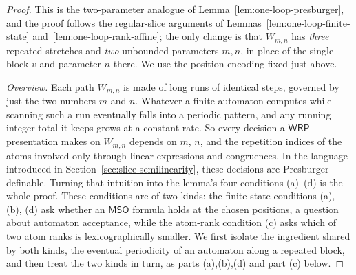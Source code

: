 \documentclass[11pt]{article}
\theoremstyle{definition}
\newcommand{\WRP}{\mathsf{WRP}}
\newcommand{\MSO}{\mathsf{MSO}}
\begin{document}
\begin{proof}
This is the two-parameter analogue of
Lemma~\ref{lem:one-loop-presburger}, and the proof follows the regular-slice
arguments of Lemmas~\ref{lem:one-loop-finite-state}
and~\ref{lem:one-loop-rank-affine}; the only change is that $W_{m,n}$ has
\emph{three} repeated stretches and \emph{two} unbounded parameters $m,n$, in
place of the single block $v$ and parameter $n$ there.  We use the position
encoding fixed just above.

\vspace{0.5em}
\noindent\emph{Overview.}  Each path $W_{m,n}$ is made of long runs of
identical steps, governed by just the two numbers $m$ and $n$.  Whatever a finite
automaton computes while scanning such a run eventually falls into a periodic
pattern, and any running integer total it keeps grows at a constant rate.  So
every decision a $\WRP$ presentation makes on $W_{m,n}$ depends on $m$, $n$, and
the repetition indices of the atoms involved only through linear expressions and
congruences.  In the language introduced in
Section~\ref{sec:slice-semilinearity}, these decisions are
Presburger-definable.  Turning
that intuition into the lemma's four conditions (a)--(d) is the whole proof.
These conditions are of two kinds: the finite-state conditions (a), (b), (d) ask
whether an $\MSO$ formula holds at the chosen positions, a question about
automaton acceptance, while the atom-rank condition (c) asks which of two atom
ranks is lexicographically smaller.  We first isolate the ingredient shared by
both kinds, the eventual
periodicity of an automaton along a repeated block, and then treat the two kinds
in turn, as parts (a),(b),(d) and part (c) below.


\end{proof}
\end{document}
